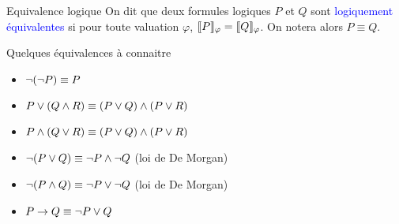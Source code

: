 \documentclass[10pt]{beamer}
\begin{document}
\begin{frame}{\Ctitle}{\stitle}
    \begin{alertblock}{Equivalence logique}
        On dit que deux formules logiques $P$ et $Q$ sont \textcolor{blue}{logiquement équivalentes} si pour toute valuation $\varphi$, $\llbracket P \rrbracket_{\varphi} = \llbracket Q \rrbracket_{\varphi}$.
        On notera alors $P \equiv Q$.\\
    \end{alertblock}
    {\begin{block}{Quelques équivalences à connaitre}
        \begin{itemize}
            \item<3-> $\neg (\neg P) \equiv P$
            \item<4-> $P \vee (Q \wedge R) \equiv (P \vee Q) \wedge (P \vee R)$
            \item<5-> $P \wedge (Q \vee R) \equiv (P \vee Q) \wedge (P \vee R)$ 
            \item<6-> $\neg (P \vee Q) \equiv \neg P \wedge \neg Q$  (loi de De Morgan)
            \item<7-> $\neg (P \wedge Q) \equiv \neg P \vee \neg Q$ (loi de De Morgan)
            \item<8-> $P \to Q \equiv   \neg P \vee Q $
        \end{itemize}
    \end{block}
}
\end{frame}
\end{document}
